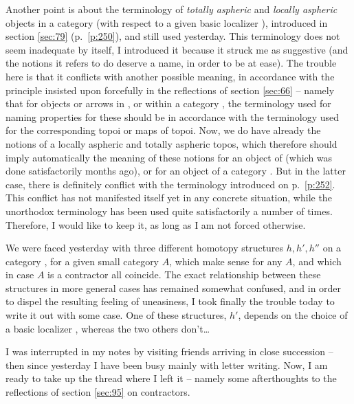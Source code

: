 Another point is about the terminology of \emph{totally aspheric} and
\emph{locally aspheric} objects in a category \Ahat{} (with respect to
a given basic localizer \scrW), introduced in section \ref{sec:79}
(p.\ \ref{p:250}), and still used yesterday. This terminology does not
seem inadequate by itself, I introduced it because it struck me as
suggestive (and the notions it refers to do deserve a name, in order
to be at ease). The trouble here is that it conflicts with another
possible meaning, in accordance with the principle insisted upon
forcefully in the reflections of section \ref{sec:66} -- namely that
for objects or arrows in \Cat, or within a category \Ahat, the
terminology used for naming properties for these should be in
accordance with the terminology used for the corresponding topoi or
maps of topoi. Now, we do have already the notions of a locally
aspheric and totally aspheric topos, which therefore should imply
automatically the meaning of these notions for an object of \Cat{}
(which was done satisfactorily months ago), or for an object of a
category \Ahat. But in the latter case, there is definitely conflict
with the terminology introduced on p.\ \ref{p:252}. This conflict has
not manifested itself yet in any concrete situation, while the
unorthodox terminology has been used quite satisfactorily a number of
times. Therefore, I would like to keep it, as long as I am not forced
otherwise.

\starsbreak

We were faced yesterday with three different homotopy
structures $h,h',h''$ on a category \Ahat, for a given small category
$A$, which make sense for any $A$, and which in case $A$ is a
contractor all coincide. The exact relationship between these
structures in more general cases has remained somewhat confused, and
in order to dispel the resulting feeling of uneasiness, I took finally
the trouble today to write it out with some case. One of these
structures, $h'$, depends on the choice of a basic localizer \scrW,
whereas the two others don't\ldots

\bigbreak
\noindent\hfill{}\par

\label{sec:97}%
I was interrupted in my notes by visiting friends arriving in close
succession -- then since yesterday I have been busy mainly with letter
writing. Now, I am ready to take up the thread where I left it --
namely some afterthoughts to the reflections of section \ref{sec:95}
on contractors.

